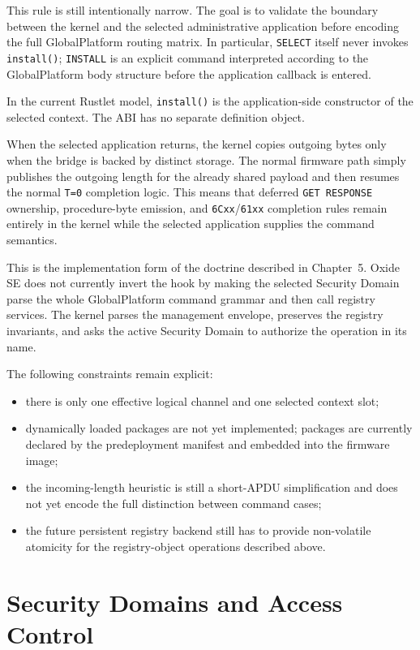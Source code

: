 This rule is still intentionally narrow. The goal is to validate the
boundary between the kernel and the selected administrative application
before encoding the full GlobalPlatform routing matrix. In particular,
\texttt{SELECT} itself never invokes \texttt{install()}; \texttt{INSTALL}
is an explicit command interpreted according to the GlobalPlatform body
structure before the
application callback is entered.

In the current Rustlet model, \texttt{install()} is the application-side
constructor of the selected context. The ABI has no separate definition
object.

When the selected application returns, the kernel copies outgoing bytes only
when the bridge is backed by distinct storage. The normal firmware path simply
publishes the outgoing length for the already shared payload and then resumes
the normal \texttt{T=0} completion logic. This means that deferred
\texttt{GET RESPONSE} ownership, procedure-byte emission, and
\texttt{6Cxx}/\texttt{61xx} completion rules remain entirely in the
kernel while the selected application supplies the command semantics.

This is the implementation form of the doctrine described in
Chapter~5. Oxide SE does not currently invert the hook by making the selected
Security Domain parse the whole GlobalPlatform command grammar and then call
registry services. The kernel parses the management envelope, preserves the
registry invariants, and asks the active Security Domain to authorize the
operation in its name.

The following constraints remain explicit:
\begin{itemize}
\item there is only one effective logical channel and one selected context
  slot;
\item dynamically loaded packages are not yet implemented; packages are
  currently declared by the predeployment manifest and embedded into the
  firmware image;
\item the incoming-length heuristic is still a short-APDU simplification
  and does not yet encode the full distinction between command cases;
\item the future persistent registry backend still has to provide
  non-volatile atomicity for the registry-object operations described above.
\end{itemize}

\section{Security Domains and Access Control}
\label{sec:impl-security-domain}

